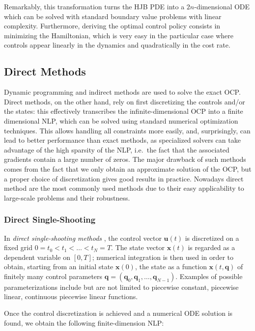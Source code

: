 Remarkably, this transformation turns the HJB PDE into a
$2n$-dimensional ODE which can be solved with standard boundary value
problems with linear complexity. Furthermore, deriving the optimal
control policy consists in minimizing the Hamiltonian, which is very
easy in the particular case where controls appear linearly in the
dynamics and quadratically in the cost rate.

\subsection{Direct Methods}
\label{subsec:chap3-direct-methods}

Dynamic programming and indirect methods are used to solve the exact
OCP. Direct methods, on the other hand, rely on first discretizing the
controls and/or the states: this effectively transcribes the
infinite-dimensional OCP into a finite dimensional NLP, which can be
solved using standard numerical optimization techniques. This allows
handling all constraints more easily, and, surprisingly, can lead to
better performance than exact methods, as specialized solvers can take
advantage of the high sparsity of the NLP, i.e.\ the fact that the
associated gradients contain a large number of zeros. The major
drawback of such methods comes from the fact that we only obtain an
approximate solution of the OCP, but a proper choice of discretization
gives good results in practice. Nowadays direct method are the most
commonly used methods due to their easy applicability to large-scale
problems and their robustness.

\subsubsection{Direct Single-Shooting}

In \emph{direct single-shooting methods}
\cite{hicks1971approximation,sargent1978development}, the control
vector $\mathbf{u}(t)$ is discretized on a fixed grid
$0=t_0<t_1<\ldots<t_N=T$. The state vector $\mathbf{x}(t)$ is regarded
as a dependent variable on $[0,T]$; numerical integration is then used
in order to obtain, starting from an initial state $\mathbf{x}(0)$,
the state as a function $\mathbf{x}(t,\mathbf{q})$ of finitely many
control parameters
$\mathbf{q}=(\mathbf{q}_0,\mathbf{q}_1,\ldots,\mathbf{q}_{N-1})$. Examples
of possible parameterizations include but are not limited to piecewise
constant, piecewise linear, continuous piecewise linear functions.

Once the control discretization is achieved and a numerical ODE
solution is found, we obtain the following finite-dimension NLP:

